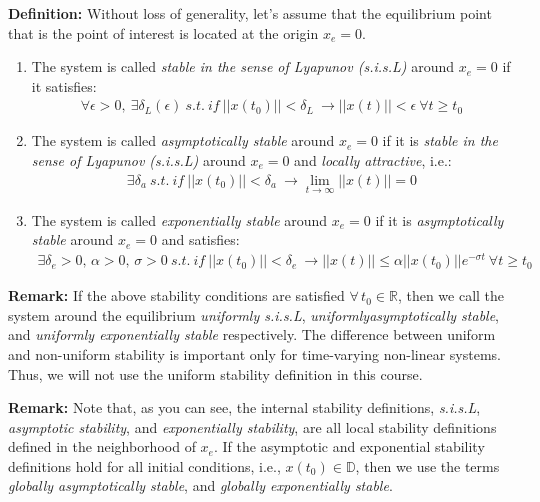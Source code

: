 \documentclass[twoside, 11pt]{article}
\begin{document}
\textbf{Definition:} Without loss of generality, let's assume that the equilibrium point that is the point of interest is located at the origin $x_e = 0$.
%
\begin{enumerate}
%
\item The system is called \textit{stable in the sense of Lyapunov (s.i.s.L)} around $x_e = 0$ if it satisfies:
%
\begin{align*}
	\forall \epsilon > 0 , \ \exists \delta_L(\epsilon) \ s.t. \ if \ || x(t_0) || < \delta_L \ \rightarrow || x(t) || < \epsilon \ \forall t \geq t_0
\end{align*}
%
\item The system is called \textit{asymptotically stable} around $x_e = 0$ if it is 
\textit{stable in the sense of Lyapunov (s.i.s.L)} around $x_e = 0$ and \textit{locally attractive}, i.e.:
%
\begin{align*}
	\exists \delta_a \ s.t. \ if \ || x(t_0) || < \delta_a \ \rightarrow \lim_{t \to \infty} || x(t) || = 0
\end{align*}
%
\item The system is called \textit{exponentially stable} around $x_e = 0$ if it is 
\textit{asymptotically stable} around $x_e = 0$ and satisfies: 
%
\begin{align*}
	\exists \delta_e > 0 , \, \alpha > 0 , \, \sigma >0 \ s.t. \ if \ || x(t_0) || < \delta_e \ \rightarrow || x(t) || \leq \alpha || x(t_0) || e^{- \sigma t} \ \forall t \geq t_0
\end{align*}
%
\end{enumerate}

\textbf{Remark:} If the above stability conditions are satisfied $\forall \, t_0 \in \mathbb{R}$, then we call the system around the equilibrium \textit{uniformly s.i.s.L}, 
\textit{uniformlyasymptotically stable}, and \textit{uniformly exponentially stable} respectively. The difference between uniform and non-uniform
stability is important only for time-varying non-linear systems. Thus, we will not use the uniform stability definition in this course. 

\textbf{Remark:} Note that, as you can see, the internal stability
definitions, \textit{s.i.s.L}, \textit{asymptotic stability}, and
\textit{exponentially stability}, are all local stability definitions
defined in the neighborhood of $x_e$. If the asymptotic and exponential stability definitions hold
for all initial conditions, i.e., $x(t_0) \in \mathbb{D}$, then we use the terms
\textit{globally asymptotically stable}, and \textit{globally exponentially stable}.
\end{document}

